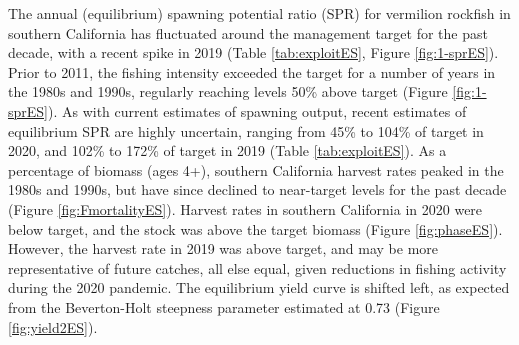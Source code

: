 \documentclass[11pt,
  english,
]{article}
\begin{document}
The annual (equilibrium) spawning potential ratio (SPR) for vermilion rockfish in southern California has fluctuated around the management target for the past decade, with a recent spike in 2019 (Table \ref{tab:exploitES}, Figure \ref{fig:1-sprES}). Prior to 2011, the fishing intensity exceeded the target for a number of years in the 1980s and 1990s, regularly reaching levels 50\% above target (Figure \ref{fig:1-sprES}). As with current estimates of spawning output, recent estimates of equilibrium SPR are highly uncertain, ranging from 45\% to 104\% of target in 2020, and 102\% to 172\% of target in 2019 (Table \ref{tab:exploitES}). As a percentage of biomass (ages 4+), southern California harvest rates peaked in the 1980s and 1990s, but have since declined to near-target levels for the past decade (Figure \ref{fig:FmortalityES}). Harvest rates in southern California in 2020 were below target, and the stock was above the target biomass (Figure \ref{fig:phaseES}). However, the harvest rate in 2019 was above target, and may be more representative of future catches, all else equal, given reductions in fishing activity during the 2020 pandemic. The equilibrium yield curve is shifted left, as expected from the Beverton-Holt steepness parameter estimated at 0.73 (Figure \ref{fig:yield2ES}).
\end{document}
